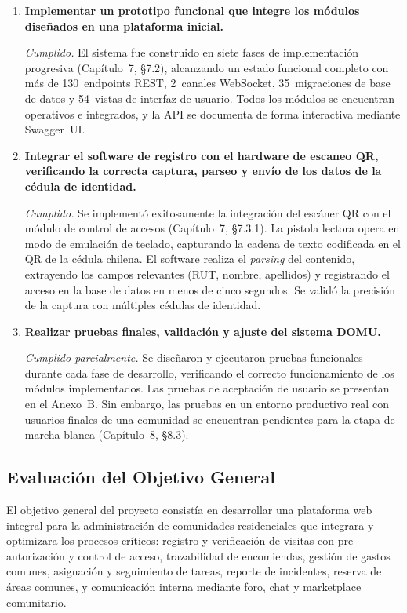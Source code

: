 \begin{enumerate}
    \item \textbf{Implementar un prototipo funcional que integre los módulos diseñados en una plataforma inicial.}

    \textit{Cumplido.} El sistema fue construido en siete fases de implementación progresiva (Capítulo~7, §7.2), alcanzando un estado funcional completo con más de 130~endpoints REST, 2~canales WebSocket, 35~migraciones de base de datos y 54~vistas de interfaz de usuario. Todos los módulos se encuentran operativos e integrados, y la API se documenta de forma interactiva mediante Swagger~UI.

    \item \textbf{Integrar el software de registro con el hardware de escaneo QR, verificando la correcta captura, parseo y envío de los datos de la cédula de identidad.}

    \textit{Cumplido.} Se implementó exitosamente la integración del escáner QR con el módulo de control de accesos (Capítulo~7, §7.3.1). La pistola lectora opera en modo de emulación de teclado, capturando la cadena de texto codificada en el QR de la cédula chilena. El software realiza el \textit{parsing} del contenido, extrayendo los campos relevantes (RUT, nombre, apellidos) y registrando el acceso en la base de datos en menos de cinco segundos. Se validó la precisión de la captura con múltiples cédulas de identidad.

    \item \textbf{Realizar pruebas finales, validación y ajuste del sistema DOMU.}

    \textit{Cumplido parcialmente.} Se diseñaron y ejecutaron pruebas funcionales durante cada fase de desarrollo, verificando el correcto funcionamiento de los módulos implementados. Las pruebas de aceptación de usuario se presentan en el Anexo~B. Sin embargo, las pruebas en un entorno productivo real con usuarios finales de una comunidad se encuentran pendientes para la etapa de marcha blanca (Capítulo~8, §8.3).
\end{enumerate}

\subsection{Evaluación del Objetivo General}

El objetivo general del proyecto consistía en desarrollar una plataforma web integral para la administración de comunidades residenciales que integrara y optimizara los procesos críticos: registro y verificación de visitas con pre-autorización y control de acceso, trazabilidad de encomiendas, gestión de gastos comunes, asignación y seguimiento de tareas, reporte de incidentes, reserva de áreas comunes, y comunicación interna mediante foro, chat y marketplace comunitario.

